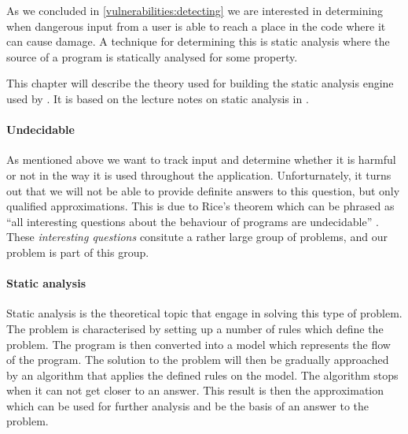 As we concluded in \cref{vulnerabilities:detecting}  we are interested in determining when dangerous input from a user is able to reach a place in the code where it can cause damage.
A technique for determining this is static analysis where the source of a program is statically analysed for some property.

This chapter will describe the theory used for building the static analysis engine used by \pyt{}.
It is based on the lecture notes on static analysis in \citet{schwartzbach}.

\paragraph{Undecidable}\label{theory_intro}
As mentioned above we want to track input and determine whether it is harmful or not in the way it is used throughout the application.
Unforturnately, it turns out that we will not be able to provide definite answers to this question, but only qualified approximations.
This is due to Rice's theorem which can be phrased as ``all interesting questions about the behaviour of programs are undecidable'' \citep[p.~3]{schwartzbach}.
These \emph{interesting questions} consitute a rather large group of problems, and our problem is part of this group.

\paragraph{Static analysis}
Static analysis is the theoretical topic that engage in solving this type of problem.
The problem is characterised by setting up a number of rules which define the problem.
The program is then converted into a model which represents the flow of the program.
The solution to the problem will then be gradually approached by an algorithm that applies the defined rules on the model.
The algorithm stops when it can not get closer to an answer.
This result is then the approximation which can be used for further analysis and be the basis of an answer to the problem.

